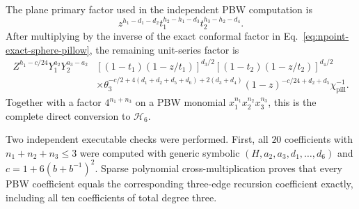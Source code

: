 \documentclass[11pt]{article}
\newcommand{\cH}{\mathcal H}
\begin{document}
The plane primary factor used in the independent PBW computation is
\begin{equation}
 z^{h_1-d_1-d_2}
 t_1^{h_2-h_1-d_3}
 t_2^{h_3-h_2-d_4}.
 \label{eq:sixpoint-plane-primary-factor}
\end{equation}
After multiplying by the inverse of the exact conformal factor in
Eq.~\eqref{eq:npoint-exact-sphere-pillow}, the remaining unit-series factor
is
\begin{align}
 Z^{h_1-c/24}Y_1^{a_2}Y_2^{a_3-a_2}
 &[(1-t_1)(1-z/t_1)]^{d_3/2}
 [(1-t_2)(1-z/t_2)]^{d_4/2}
 \nonumber\\[-1mm]
 &\times
 \theta_3^{-c/2+4(d_1+d_2+d_5+d_6)+2(d_3+d_4)}
 (1-z)^{-c/24+d_2+d_5}\chi_{\mathrm{pill}}^{-1}.
 \label{eq:sixpoint-pbw-stripping-factor}
\end{align}
Together with a factor $4^{n_1+n_3}$ on a PBW monomial
$x_1^{n_1}x_2^{n_2}x_3^{n_3}$, this is the complete direct conversion to
$\cH_6$.

Two independent executable checks were performed.
First, all $20$ coefficients with $n_1+n_2+n_3\leq3$ were computed with
generic symbolic
$(H,a_2,a_3,d_1,\ldots,d_6)$ and
$c=1+6(b+b^{-1})^2$.  Sparse polynomial cross-multiplication proves that
every PBW coefficient equals the corresponding three-edge recursion
coefficient exactly, including all ten coefficients of total degree three.
\end{document}
